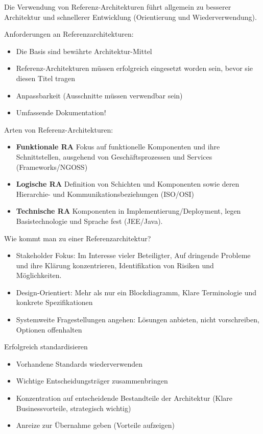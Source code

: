 Die Verwendung von Referenz-Architekturen führt allgemein zu besserer Architektur und schnellerer Entwicklung (Orientierung und Wiederverwendung). 

Anforderungen an Referenzarchitekturen:
\begin{itemize}
	\item Die Basis sind bewährte Architektur-Mittel
	\item Referenz-Architekturen müssen erfolgreich eingesetzt worden sein, bevor sie diesen Titel tragen
	\item Anpassbarkeit (Ausschnitte müssen verwendbar sein)
	\item Umfassende Dokumentation!
\end{itemize}

Arten von Referenz-Architekturen:
\begin{itemize}
	\item \textbf{Funktionale RA} Fokus auf funktionelle Komponenten und ihre Schnittstellen, ausgehend von Geschäftsprozessen und Services (Frameworks/NGOSS)
	\item \textbf{Logische RA} Definition von Schichten und Komponenten sowie deren Hierarchie- und Kommunikationsbeziehungen (ISO/OSI)
	\item \textbf{Technische RA} Komponenten in Implementierung/Deployment, legen Basistechnologie und Sprache fest (JEE/Java).
\end{itemize}

Wie kommt man zu einer Referenzarchitektur?
\begin{itemize}
	\item Stakeholder Fokus: Im Interesse vieler Beteiligter, Auf dringende Probleme und ihre Klärung konzentrieren, Identifikation von Risiken und Möglichkeiten.
	
	\item Design-Orientiert: Mehr als nur ein Blockdiagramm, Klare Terminologie und konkrete Spezifikationen
	
	\item Systemweite Fragestellungen angehen: Lösungen anbieten, nicht vorschreiben, Optionen offenhalten
\end{itemize}

Erfolgreich standardisieren
\begin{itemize}
	\item Vorhandene Standards wiederverwenden
	\item Wichtige Entscheidungsträger zusammenbringen
	\item Konzentration auf entscheidende Bestandteile der Architektur (Klare Businessvorteile, strategisch wichtig)
	\item Anreize zur Übernahme geben (Vorteile aufzeigen)
\end{itemize}

